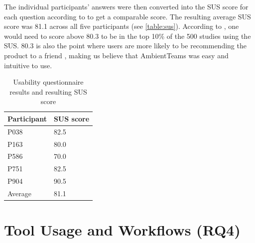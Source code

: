 The individual participants' answers were then converted into the SUS score for each question according to \textcite{sauroSUS} to get a comparable score. The resulting average SUS score was 81.1 across all five participants (see \autoref{table:sus}). According to \textcite{sauroSUS}, one would need to score above 80.3 to be in the top 10\% of the 500 studies using the SUS. 80.3 is also the point where users are more likely to be recommending the product to a friend \autocite{sauroSUS}, making us believe that AmbientTeams was easy and intuitive to use.

\begin{table}[h]
    \centering
    \begin{tabular}{|l | l|}
        \hline
        Participant & SUS score \\
        \hline
        P038        & 82.5      \\
        P163        & 80.0      \\
        P586        & 70.0      \\
        P751        & 82.5      \\
        P904        & 90.5      \\
        \hline
        Average     & 81.1      \\
        \hline
    \end{tabular}
    \caption{Usability questionnaire results and resulting SUS score}
    \label{table:sus}
\end{table}

\section{Tool Usage and Workflows (RQ4)}
\label{section:tool_usage_and_workflows}

